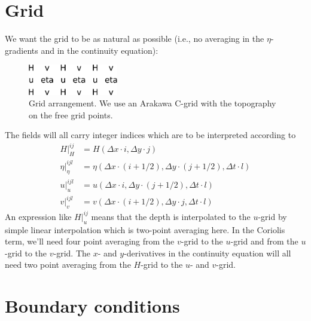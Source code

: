 \documentclass[a4paper]{article}
\begin{document}

\section{Grid}

We want the grid to be as natural as possible (i.e., no averaging in the 
$\eta$-gradients and in the continuity equation):

\begin{figure}[h]
  \begin{center}
    \includegraphics[width=0.35\textwidth]{images/grid}
  \end{center}
  \caption{Grid arrangement. We use an Arakawa C-grid with the topography
    on the free grid points.  }
\end{figure}

The fields will all carry integer indices which are to be interpreted according to
\begin{align}
  H|_H^{ij} & = H(\Delta x \cdot i, \Delta y \cdot j) \\
  \eta|_\eta^{ijl} & = \eta(\Delta x \cdot (i+1/2), \Delta y \cdot (j+1/2), \Delta t \cdot l) \\
  u|_u^{ijl} & = u(\Delta x \cdot i, \Delta y \cdot (j+1/2), \Delta t \cdot l) \\
  v|_v^{ijl} & = v(\Delta x \cdot (i+1/2), \Delta y \cdot j, \Delta t \cdot l)
\end{align}
An expression like $H|_u^{ij}$ means that the depth is interpolated to the $u$-grid
by simple linear interpolation which is two-point averaging here. In the Coriolis term, 
we'll need four point averaging from the $v$-grid to the $u$-grid and from the $u$-grid
to the $v$-grid. The $x$- and $y$-derivatives in the continuity equation will all need 
two point averaging from the $H$-grid to the $u$- and $v$-grid.


\section{Boundary conditions}

\end{document}
